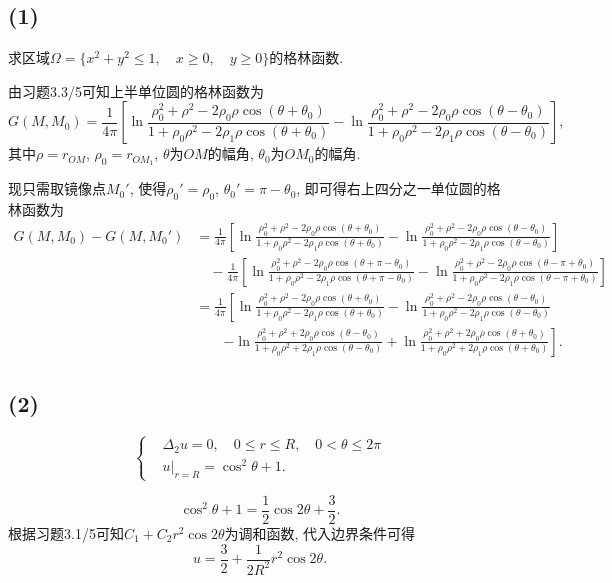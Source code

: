 \documentclass[11pt,a4paper]{article}
\begin{document}
\subsection*{(1)}
\begin{problem}
求区域$\Omega=\{x^2+y^2\leqslant 1,\quad x\geqslant0,\quad y\geqslant 0\}$的格林函数.
\end{problem}
由习题3.3/5可知上半单位圆的格林函数为
$$G(M,M_0)=\frac{1}{4\pi}\left[\ln\frac{\rho_0^2+\rho^2-2\rho_0\rho\cos(\theta+\theta_0)}{1+\rho_0\rho^2-2\rho_1\rho\cos(\theta+\theta_0)}-\ln\frac{\rho_0^2+\rho^2-2\rho_0\rho\cos(\theta-\theta_0)}{1+\rho_0\rho^2-2\rho_1\rho\cos(\theta-\theta_0)}\right],$$
其中$\rho=r_{OM}$, $\rho_0=r_{OM_1}$, $\theta$为$OM$的幅角, $\theta_0$为$OM_0$的幅角.

现只需取镜像点$M_0'$, 使得$\rho_0'=\rho_0$, $\theta_0'=\pi-\theta_0$, 即可得右上四分之一单位圆的格林函数为
\begin{align*}
  G(M,M_0)-G(M,M_0')
   & =\frac{1}{4\pi}\left[\ln\frac{\rho_0^2+\rho^2-2\rho_0\rho\cos(\theta+\theta_0)}{1+\rho_0\rho^2-2\rho_1\rho\cos(\theta+\theta_0)}-\ln\frac{\rho_0^2+\rho^2-2\rho_0\rho\cos(\theta-\theta_0)}{1+\rho_0\rho^2-2\rho_1\rho\cos(\theta-\theta_0)}\right]                      \\
   & \quad-\frac{1}{4\pi}\left[\ln\frac{\rho_0^2+\rho^2-2\rho_0\rho\cos(\theta+\pi-\theta_0)}{1+\rho_0\rho^2-2\rho_1\rho\cos(\theta+\pi-\theta_0)}-\ln\frac{\rho_0^2+\rho^2-2\rho_0\rho\cos(\theta-\pi+\theta_0)}{1+\rho_0\rho^2-2\rho_1\rho\cos(\theta-\pi+\theta_0)}\right] \\
   & =\frac{1}{4\pi}\left[\ln\frac{\rho_0^2+\rho^2-2\rho_0\rho\cos(\theta+\theta_0)}{1+\rho_0\rho^2-2\rho_1\rho\cos(\theta+\theta_0)}-\ln\frac{\rho_0^2+\rho^2-2\rho_0\rho\cos(\theta-\theta_0)}{1+\rho_0\rho^2-2\rho_1\rho\cos(\theta-\theta_0)}\right.                      \\
   & \qquad\left.-\ln\frac{\rho_0^2+\rho^2+2\rho_0\rho\cos(\theta-\theta_0)}{1+\rho_0\rho^2+2\rho_1\rho\cos(\theta-\theta_0)}+\ln\frac{\rho_0^2+\rho^2+2\rho_0\rho\cos(\theta+\theta_0)}{1+\rho_0\rho^2+2\rho_1\rho\cos(\theta+\theta_0)}\right].
\end{align*}

\subsection*{(2)}
\begin{problem}
$$\left\{\begin{aligned}
     & \Delta_2 u=0,\quad 0\leqslant r\leqslant R,\quad 0<\theta\leqslant 2\pi \\
     & u|_{r=R}=\cos^2\theta+1.
  \end{aligned}\right.$$
\end{problem}
$$\cos^2\theta+1=\frac{1}{2}\cos2\theta+\frac{3}{2}.$$
根据习题3.1/5可知$C_1+C_2r^2\cos2\theta$为调和函数, 代入边界条件可得
$$u=\frac{3}{2}+\frac{1}{2R^2}r^2\cos2\theta.$$
\end{document}
